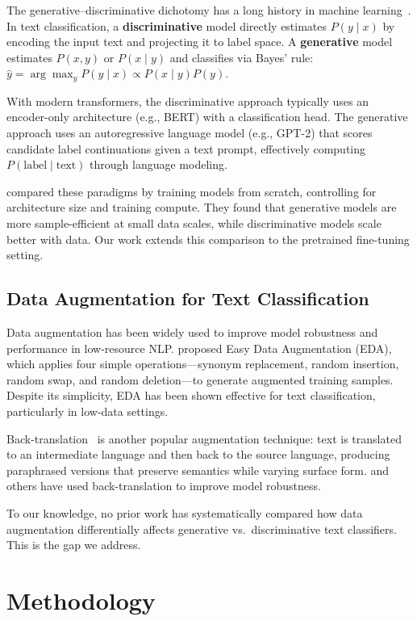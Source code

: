 \documentclass[11pt,a4paper]{article}
\begin{document}
The generative--discriminative dichotomy has a long history in machine learning~\cite{ng2002discriminative}. In text classification, a \textbf{discriminative} model directly estimates $P(y \mid x)$ by encoding the input text and projecting it to label space. A \textbf{generative} model estimates $P(x, y)$ or $P(x \mid y)$ and classifies via Bayes' rule: $\hat{y} = \arg\max_y P(y \mid x) \propto P(x \mid y)P(y)$.

With modern transformers, the discriminative approach typically uses an encoder-only architecture (e.g., BERT) with a classification head. The generative approach uses an autoregressive language model (e.g., GPT-2) that scores candidate label continuations given a text prompt, effectively computing $P(\text{label} \mid \text{text})$ through language modeling.

\citet{kasa2025generative} compared these paradigms by training models from scratch, controlling for architecture size and training compute. They found that generative models are more sample-efficient at small data scales, while discriminative models scale better with data. Our work extends this comparison to the pretrained fine-tuning setting.

\subsection{Data Augmentation for Text Classification}

Data augmentation has been widely used to improve model robustness and performance in low-resource NLP. \citet{wei2019eda} proposed Easy Data Augmentation (EDA), which applies four simple operations---synonym replacement, random insertion, random swap, and random deletion---to generate augmented training samples. Despite its simplicity, EDA has been shown effective for text classification, particularly in low-data settings.

Back-translation~\cite{sennrich2016improving} is another popular augmentation technique: text is translated to an intermediate language and then back to the source language, producing paraphrased versions that preserve semantics while varying surface form. \citet{yu2018qanet} and others have used back-translation to improve model robustness.

To our knowledge, no prior work has systematically compared how data augmentation differentially affects generative vs.\ discriminative text classifiers. This is the gap we address.

\section{Methodology}
\end{document}
